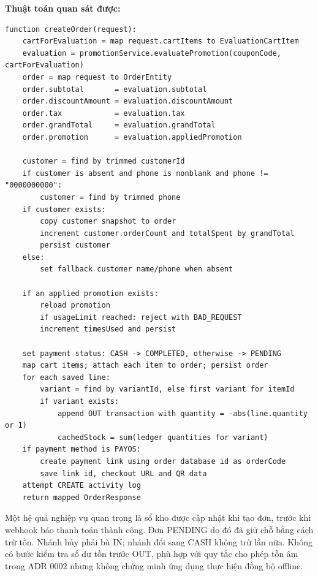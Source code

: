\documentclass[12pt,a4paper,oneside]{report}
\begin{document}
\textbf{Thuật toán quan sát được:}
\begin{lstlisting}[style=pseudo]
function createOrder(request):
    cartForEvaluation = map request.cartItems to EvaluationCartItem
    evaluation = promotionService.evaluatePromotion(couponCode, cartForEvaluation)
    order = map request to OrderEntity
    order.subtotal       = evaluation.subtotal
    order.discountAmount = evaluation.discountAmount
    order.tax            = evaluation.tax
    order.grandTotal     = evaluation.grandTotal
    order.promotion      = evaluation.appliedPromotion

    customer = find by trimmed customerId
    if customer is absent and phone is nonblank and phone != "0000000000":
        customer = find by trimmed phone
    if customer exists:
        copy customer snapshot to order
        increment customer.orderCount and totalSpent by grandTotal
        persist customer
    else:
        set fallback customer name/phone when absent

    if an applied promotion exists:
        reload promotion
        if usageLimit reached: reject with BAD_REQUEST
        increment timesUsed and persist

    set payment status: CASH -> COMPLETED, otherwise -> PENDING
    map cart items; attach each item to order; persist order
    for each saved line:
        variant = find by variantId, else first variant for itemId
        if variant exists:
            append OUT transaction with quantity = -abs(line.quantity or 1)
            cachedStock = sum(ledger quantities for variant)
    if payment method is PAYOS:
        create payment link using order database id as orderCode
        save link id, checkout URL and QR data
    attempt CREATE activity log
    return mapped OrderResponse
\end{lstlisting}

Một hệ quả nghiệp vụ quan trọng là sổ kho được cập nhật khi tạo đơn, trước khi webhook báo thanh toán thành công. Đơn PENDING do đó đã giữ chỗ bằng cách trừ tồn. Nhánh hủy phải bù IN; nhánh đổi sang CASH không trừ lần nữa. Không có bước kiểm tra số dư tồn trước OUT, phù hợp với quy tắc cho phép tồn âm trong ADR 0002 nhưng không chứng minh ứng dụng thực hiện đồng bộ offline.
\end{document}
